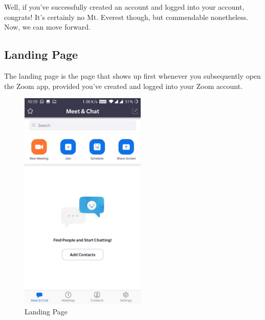 \documentclass[14pt]{report}
\begin{document}
                        Well, if you've successfully created an account and logged into your account, congrats! It's certainly no Mt. Everest though, but commendable nonetheless. Now, we can move forward.

                    \subsection{Landing Page}
                        The landing page is the page that shows up first whenever you subsequently open the Zoom app, provided you've created and logged into your Zoom account.\\
                        \begin{figure}[H]
                            \includegraphics[width=6cm]{MainScreen.jpeg}
                            \centering
                            \caption{Landing Page}
                            \label{fig:LandingPage}
                        \end{figure}
\end{document}
